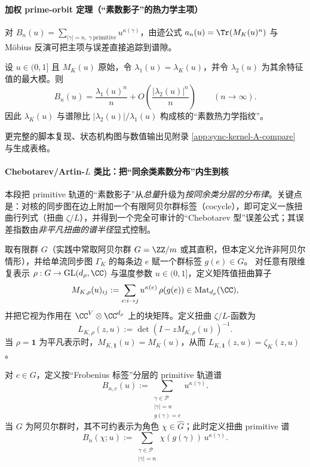 \paragraph{加权 prime-orbit 定理（“素数影子”的热力学主项）}
对 $B_n(u)=\sum_{|\gamma|=n,\ \gamma\ \mathrm{primitive}}u^{\kappa(\gamma)}$，由迹公式 $a_n(u)=\Tr(M_K(u)^n)$ 与 Möbius 反演可把主项与误差直接追踪到谱隙。

\begin{theorem}\label{thm:kernel-weighted-prime-orbit}
设 $u\in(0,1]$ 且 $M_K(u)$ 原始，令 $\lambda_1(u)=\lambda_K(u)$，并令 $\lambda_2(u)$ 为其余特征值的最大模。则
\[
B_n(u)=\frac{\lambda_1(u)^n}{n}+O\!\left(\frac{|\lambda_2(u)|^n}{n}\right)\qquad(n\to\infty).
\]
因此 \(\lambda_K(u)\) 与谱隙比 \( |\lambda_2(u)|/\lambda_1(u)\) 构成核的“素数热力学指纹”。
\end{theorem}

更完整的脚本复现、状态机构图与数值输出见附录 \ref{app:sync-kernel-A-compare} 与生成表格。

\paragraph{Chebotarev/Artin-\texorpdfstring{$L$}{L} 类比：把“同余类素数分布”内生到核}
本段把 primitive 轨道的“素数影子”从\emph{总量}升级为\emph{按同余类分层的分布律}。关键点是：对核的同步图在边上附加一个有限阿贝尔群标签（cocycle），即可定义一族扭曲行列式（扭曲 $\zeta/L$），并得到一个完全可审计的“Chebotarev 型”误差公式；其误差指数由\emph{非平凡扭曲的谱半径}显式控制。

\begin{definition}[有限群标签与扭曲矩阵族]\label{def:kernel-group-twist}
取有限群 $G$（实践中常取阿贝尔群 $G=\ZZ/m$ 或其直积，但本定义允许非阿贝尔情形），并给单流同步图 $\Gamma_K$ 的每条边 $e$ 赋一个群标签 $g(e)\in G$。
对任意有限维复表示 $\rho:G\to\mathrm{GL}(d_\rho,\CC)$ 与温度参数 $u\in(0,1]$，定义矩阵值扭曲算子
\[
M_{K,\rho}(u)_{ij}:=\sum_{e:i\to j}u^{\kappa(e)}\,\rho(g(e))\in\mathrm{Mat}_{d_\rho}(\CC),
\]
并把它视为作用在 $\CC^{V}\otimes\CC^{d_\rho}$ 上的块矩阵。定义扭曲 $\zeta/L$-函数为
\[
L_{K,\rho}(z,u):=\det(I-zM_{K,\rho}(u))^{-1}.
\]
当 $\rho=\mathbf{1}$ 为平凡表示时，$M_{K,\mathbf{1}}(u)=M_K(u)$，从而 $L_{K,\mathbf{1}}(z,u)=\zeta_K(z,u)$。
\end{definition}

\begin{definition}\label{def:kernel-chebotarev-spectrum}
对 $c\in G$，定义按“Frobenius 标签”分层的 primitive 轨道谱
\[
B_{n,c}(u):=\sum_{\substack{\gamma\in\mathcal{P}\\|\gamma|=n\\g(\gamma)=c}}u^{\kappa(\gamma)}.
\]
当 $G$ 为阿贝尔群时，其不可约表示为角色 $\chi\in\widehat G$；此时定义扭曲 primitive 谱
\[
B_n(\chi;u):=\sum_{\substack{\gamma\in\mathcal{P}\\|\gamma|=n}}\chi(g(\gamma))\,u^{\kappa(\gamma)}.
\]
\end{definition}

